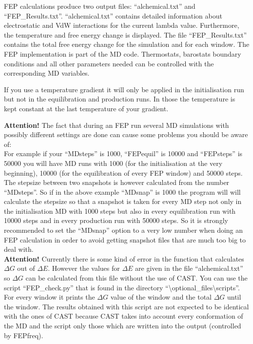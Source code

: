 \documentclass[10pt,a4paper]{article} %
\begin{document}
	\ac{FEP} calculations produce two output files: ``alchemical.txt'' and ``FEP\_Results.txt''. ``alchemical.txt'' contains detailed information about electrostatic and \ac{VdW} interactions for the current lambda value. Furthermore, the temperature and free energy change is displayed. The file ``FEP\_Results.txt'' contains the total free energy change for the simulation and for each window.
	The \ac{FEP} implementation is part of the \ac{MD} code. Thermostats, barostats boundary conditions and all other parameters needed can be controlled with the corresponding \ac{MD} variables.
	
	If you use a temperature gradient it will only be applied in the initialisation run but not in the equilibration and production runs. In those the temperature is kept constant at the last temperature of your gradient.
	
\textbf{Attention!} The fact that during an FEP run several MD simulations with possibly different settings are done can cause some problems you should be aware of: \\
For example if your ``MDsteps'' is 1000, ``FEPequil'' is 10000 and ``FEPsteps'' is 50000 you will have MD runs with 1000 (for the initialisation at the very beginning), 10000 (for the equilibration of every FEP window) and 50000 steps. The stepsize between two snapshots is however calculated from the number ``MDsteps''. So if in the above example ``MDsnap'' is 1000 the program will will calculate the stepsize so that a snapshot is taken for every MD step not only in the initialisation MD with 1000 steps but also in every equilibration run with 10000 steps and in every production run with 50000 steps. So it is strongly recommended to set the ``MDsnap'' option to a very low number when doing an FEP calculation in order to avoid getting snapshot files that are much too big to deal with. \\
\textbf{Attention!} Currently there is some kind of error in the function that calculates $\Delta G$ out of $\Delta E$. However the values for $\Delta E$ are given in the file ``alchemical.txt'' so $\Delta G$ can be calculated from this file without the use of CAST. You can use the script ``FEP\_check.py'' that is found in the directory ``\textbackslash optional\_files\textbackslash scripts''. For every window it prints the $\Delta G$ value of the window and the total $\Delta G$ until the window. The results obtained with this script are not expected to be identical with the ones of CAST because CAST takes into account every conformation of the MD and the script only those which are written into the output (controlled by FEPfreq).
\end{document}
